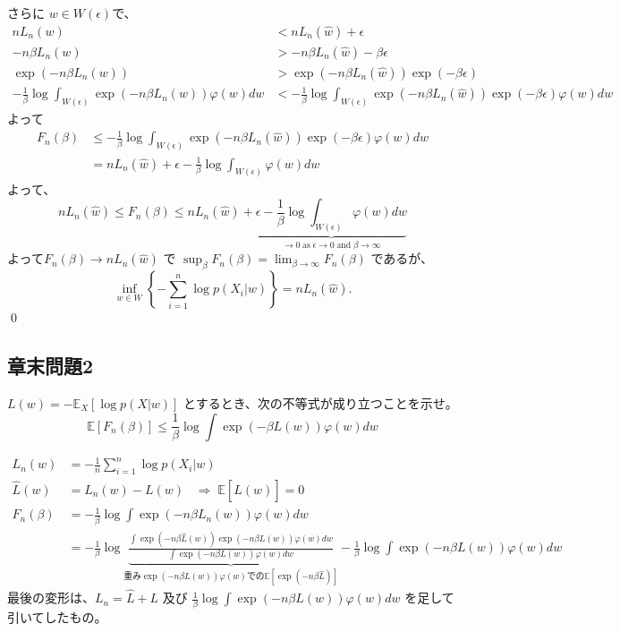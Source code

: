 \documentclass[dvipdfmx,11pt]{jsarticle}
\newcommand{\EE}{{\mathbb{E}}}
\begin{document}
さらに $w \in W(\epsilon)$で、
\begin{align*}
n L_n(w) &< n L_n(\hat{w}) + \epsilon \\
-n\beta L_n(w) &> -n\beta L_n(\hat{w}) -\beta \epsilon \\
\exp(-n\beta L_n(w)) &> \exp(-n\beta L_n(\hat{w})) \exp(-\beta \epsilon) \\
-\frac1\beta \log \int_{W(\epsilon)} \exp(-n\beta L_n(w)) \varphi(w)dw &< -\frac1\beta \log \int_{W(\epsilon)}\exp(-n\beta L_n(\hat{w})) \exp(-\beta \epsilon) \varphi(w)dw
\end{align*}
よって
\begin{align*}
F_n(\beta) &\leq -\frac1\beta \log \int_{W(\epsilon)}\exp(-n\beta L_n(\hat{w})) \exp(-\beta \epsilon) \varphi(w)dw \\
&= nL_n(\hat{w}) + \epsilon - \frac1\beta \log \int_{W(\epsilon)}\varphi(w)dw
\end{align*}
よって、
$$nL_n(\hat{w}) \leq F_n(\beta) \leq nL_n(\hat{w}) + \underbrace{\epsilon - \frac1\beta \log \int_{W(\epsilon)}\varphi(w)dw}_{\to 0 \;\text{as}\; \epsilon\to 0 \;\text{and}\; \beta\to\infty}$$
よって$F_n(\beta)\to nL_n(\hat{w})$ で $\sup_\beta F_n(\beta) = \lim_{\beta\to\infty} F_n(\beta)$ であるが、
$$\inf_{w\in W} \left\{-\sum_{i=1}^n \log p(X_i|w)\right\} = nL_n(\hat{w}).$$ \qed

\subsection*{章末問題2}
$L(w) = -\EE_X[\log p(X|w)]$ とするとき、次の不等式が成り立つことを示せ。
$$\EE[F_n(\beta)] \leq \frac1\beta \log \int \exp(-\beta L(w))\varphi(w)dw$$

\begin{align*}
L_n(w) &= -\frac1n \sum_{i=1}^n \log p(X_i|w) \\
\hat{L}(w) &= L_n(w) - L(w) \;\;\; \Rightarrow \; \EE[\hat{L}(w)] = 0\\
F_n(\beta) &= -\frac1\beta \log \int \exp\left(-n\beta L_n(w)\right)\varphi(w) dw \\
&= -\frac1\beta \log \underbrace{\frac{\int \exp\left(-n\beta \hat{L}(w)\right)\exp\left(-n\beta L(w)\right)\varphi(w) dw}{\int \exp\left(-n\beta L(w)\right)\varphi(w) dw}}_{\text{重み} \exp\left(-n\beta L(w)\right)\varphi(w)\text{での}\EE[\exp\left(-n\beta \hat{L}\right)]} - \frac1\beta \log \int \exp\left(-n\beta L(w)\right)\varphi(w) dw
\end{align*}
最後の変形は、$L_n = \hat{L}+L$ 及び $\frac1\beta \log \int \exp\left(-n\beta L(w)\right)\varphi(w) dw$ を足して引いてしたもの。
\end{document}
